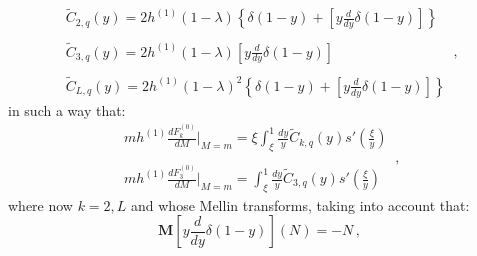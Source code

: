 \documentclass[10pt,a4paper]{article}
\begin{document}
\begin{equation}\label{RoughCF}
\begin{array}{l}
\displaystyle \widetilde{C}_{2,q}(y)=2h^{(1)}(1-\lambda)\left\{\delta(1-y)+\left[y\frac{d}{dy}\delta(1-y)\right]\right\}\\
\\
\displaystyle \widetilde{C}_{3,q}(y)=2h^{(1)}(1-\lambda)\left[y\frac{d}{dy}\delta(1-y)\right]\\
\\
\displaystyle \widetilde{C}_{L,q}(y)=2h^{(1)}(1-\lambda)^2\left\{\delta(1-y)+\left[y\frac{d}{dy}\delta(1-y)\right]\right\}
\end{array}\,,
\end{equation}
in such a way that:
\begin{equation}
\begin{array}{l}
\displaystyle mh^{(1)}\frac{dF^{(0)}_k}{dM}\bigg|_{M=m} = \xi \int_\xi^1\frac{dy}{y}\widetilde{C}_{k,q}(y)s'\left(\frac{\xi}{y}\right)\\
\\
\displaystyle mh^{(1)}\frac{dF^{(0)}_3}{dM}\bigg|_{M=m} = \int_\xi^1\frac{dy}{y}\widetilde{C}_{3,q}(y)s'\left(\frac{\xi}{y}\right)
\end{array}\,,
\end{equation}
where now $k=2,L$ and whose Mellin transforms, taking into account that:
\begin{equation}
\mathbf{M}\left[y\frac{d}{dy}\delta(1-y)\right](N) = - N\,,
\end{equation}
\end{document}
